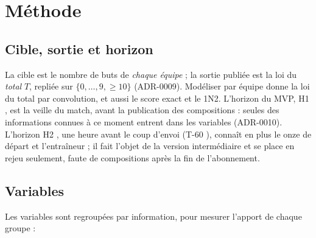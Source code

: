 
\chapter{Méthode}
\label{chap:methode}

\section{Cible, sortie et horizon}

La cible est le nombre de buts de \emph{chaque équipe} ; la sortie publiée est la loi du \emph{total}
\(T\), repliée sur \(\{0, \dots, 9, \ge 10\}\) (ADR-0009). Modéliser par équipe donne la loi du total
par convolution, et aussi le score exact et le 1N2. L'horizon du MVP, \og H1 \fg{}, est la veille du
match, avant la publication des compositions : seules des informations connues à ce moment entrent dans
les variables (ADR-0010). L'horizon \og H2 \fg{}, une heure avant le coup d'envoi (\og T-60 \fg{}), connaît
en plus le onze de départ et l'entraîneur ; il fait l'objet de la version intermédiaire et se place en
rejeu seulement, faute de compositions après la fin de l'abonnement.

\section{Variables}

Les variables sont regroupées par information, pour mesurer l'apport de chaque groupe :

